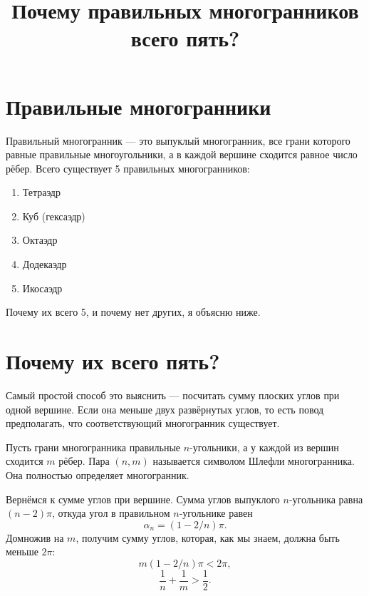 

\title{Почему правильных многогранников всего пять?}


\maketitle
\tableofcontents

\section{Правильные многогранники}

Правильный многогранник --- это выпуклый многогранник, все грани которого равные правильные многоугольники, а в каждой вершине сходится равное число рёбер. Всего существует 5 правильных многогранников:

\begin{enumerate}
  \item Тетраэдр
  \item Куб (гексаэдр)
  \item Октаэдр
  \item Додекаэдр
  \item Икосаэдр
\end{enumerate}


Почему их всего 5, и почему нет других, я объясню ниже.

\section{Почему их всего пять?}

Самый простой способ это выяснить --- посчитать сумму плоских углов при одной вершине. Если она меньше двух развёрнутых углов, то есть повод предполагать, что соответствующий многогранник существует.

Пусть грани многогранника правильные \(n\)-угольники, а у каждой из вершин сходится \(m\) рёбер. Пара \( (n, m)  \) называется символом Шлефли многогранника. Она полностью определяет многогранник.

Вернёмся к сумме углов при вершине. Сумма углов выпуклого \(n\)-угольника равна \( (n-2)\pi \), откуда угол в правильном \(n\)-угольнике равен
\[
    \alpha_n = (1-2/n)\pi.
\]
Домножив на \(m\), получим сумму углов, которая, как мы знаем, должна быть меньше \( 2\pi \):
\[
    m(1-2/n)\pi < 2\pi,
\]
\[
    \frac{1}{n} + \frac{1}{m} > \frac{1}{2}.
\]

